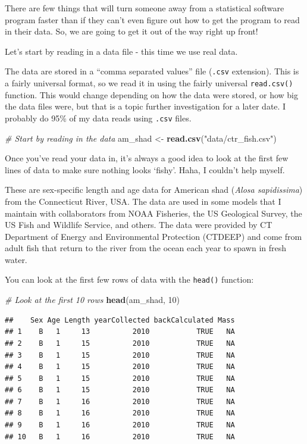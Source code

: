 \documentclass[
]{book}
\newenvironment{Shaded}{\begin{snugshade}}{\end{snugshade}}
\newcommand{\CommentTok}[1]{\textcolor[rgb]{0.56,0.35,0.01}{\textit{#1}}}
\newcommand{\DecValTok}[1]{\textcolor[rgb]{0.00,0.00,0.81}{#1}}
\newcommand{\KeywordTok}[1]{\textcolor[rgb]{0.13,0.29,0.53}{\textbf{#1}}}
\newcommand{\NormalTok}[1]{#1}
\newcommand{\StringTok}[1]{\textcolor[rgb]{0.31,0.60,0.02}{#1}}
\begin{document}
There are few things that will turn someone away from a statistical software program faster than if they can't even figure out how to get the program to read in their data. So, we are going to get it out of the way right up front!

Let's start by reading in a data file - this time we use real data.

The data are stored in a ``comma separated values'' file (\texttt{.csv} extension). This is a fairly universal format, so we read it in using the fairly universal \texttt{read.csv()} function. This would change depending on how the data were stored, or how big the data files were, but that is a topic further investigation for a later date. I probably do 95\% of my data reads using \texttt{.csv} files.

\begin{Shaded}
\begin{Highlighting}[]
\CommentTok{# Start by reading in the data}
\NormalTok{am_shad <-}\StringTok{ }\KeywordTok{read.csv}\NormalTok{(}\StringTok{"data/ctr_fish.csv"}\NormalTok{)}
\end{Highlighting}
\end{Shaded}

Once you've read your data in, it's always a good idea to look at the first few lines of data to make sure nothing looks `fishy'. Haha, I couldn't help myself.

These are sex-specific length and age data for American shad (\emph{Alosa sapidissima}) from the Connecticut River, USA. The data are used in some models that I maintain with collaborators from NOAA Fisheries, the US Geological Survey, the US Fish and Wildlife Service, and others. The data were provided by CT Department of Energy and Environmental Protection (CTDEEP) and come from adult fish that return to the river from the ocean each year to spawn in fresh water.

You can look at the first few rows of data with the \texttt{head()} function:

\begin{Shaded}
\begin{Highlighting}[]
\CommentTok{# Look at the first 10 rows}
\KeywordTok{head}\NormalTok{(am_shad, }\DecValTok{10}\NormalTok{)}
\end{Highlighting}
\end{Shaded}

\begin{verbatim}
##    Sex Age Length yearCollected backCalculated Mass
## 1    B   1     13          2010           TRUE   NA
## 2    B   1     15          2010           TRUE   NA
## 3    B   1     15          2010           TRUE   NA
## 4    B   1     15          2010           TRUE   NA
## 5    B   1     15          2010           TRUE   NA
## 6    B   1     15          2010           TRUE   NA
## 7    B   1     16          2010           TRUE   NA
## 8    B   1     16          2010           TRUE   NA
## 9    B   1     16          2010           TRUE   NA
## 10   B   1     16          2010           TRUE   NA
\end{verbatim}
\end{document}
